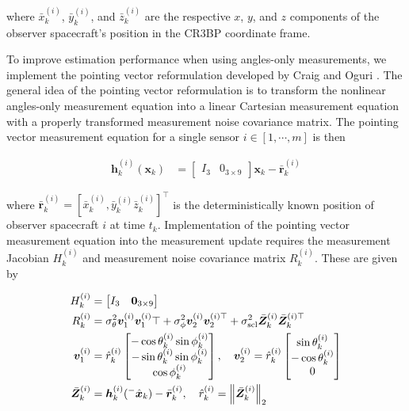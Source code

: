 \documentclass[letterpaper, preprint, paper,11pt]{AAS}	%
\begin{document}
\noindent where $\bar{x}_k^{(i)}$, $\bar{y}_k^{(i)}$, and $\bar{z}_k^{(i)}$ are the respective $x$, $y$, and $z$ components of the observer spacecraft's position in the CR3BP coordinate frame. 

To improve estimation performance when using angles-only measurements, we implement the pointing vector reformulation developed by Craig and Oguri \cite{craig2024robust}. The general idea of the pointing vector reformulation is to transform the nonlinear angles-only measurement equation into a linear Cartesian measurement equation with a properly transformed measurement noise covariance matrix. The pointing vector measurement equation for a single sensor $i \in [1, \cdots, m]$ is then 

\begin{align}
    \bm{h}_k^{(i)}(\bm{x}_k) &= \begin{bmatrix}
        I_3 & 0_{3 \times 9}
    \end{bmatrix} \bm{x}_k - \bar{\bm{r}}_k^{(i)}
\end{align}

\noindent where $\bar{\bm{r}}_k^{(i)} = [\bar{x}_k^{(i)}, \bar{y}_k^{(i)}\bar{z}_k^{(i)}]^\top$ is the deterministically known position of observer spacecraft $i$ at time $t_k$. Implementation of the pointing vector measurement equation into the measurement update requires the measurement Jacobian $H_k^{(i)}$ and measurement noise covariance matrix $R_k^{(i)}$. These are given by

\begin{align}
    H_k^{(i)} &= \begin{bmatrix}
        I_3 & \bm{0}_{3 \times 9} 
    \end{bmatrix} \\
    R_k^{(i)} &= \sigma_\theta^2 \bm{v}_1^{(i)}\bm{v}_1^{(i)}\top + \sigma_\phi^2\bm{v}_2^{(i)}\bm{v}_2^{(i)\top} + \sigma_\text{scl}^2 \bar{\bm{Z}}_k^{(i)} \bar{\bm{Z}}_k^{(i)\top} \\
    \bm{v}_1^{(i)} &= \hat{r}_k^{(i)}\begin{bmatrix}
        -\cos \theta_k^{(i)} \sin \phi_k^{(i)} \\
        -\sin \theta_k^{(i)} \sin \phi_k^{(i)} \\
        \cos \phi_k^{(i)}
    \end{bmatrix}, \quad \bm{v}_2^{(i)} = \hat{r}_k^{(i)} \begin{bmatrix}
        \sin \theta_k^{(i)} \\
        -\cos \theta_k^{(i)} \\
        0
    \end{bmatrix} \notag \\
    \bar{\bm{Z}}_k^{(i)} &= \bm{h}_k^{(i)}({}^-\hat{\bm{x}}_k) - \bar{\bm{r}}_k^{(i)}, \quad \hat{r}_k^{(i)} = \norm{\bar{\bm{Z}}_k^{(i)}}_2 \notag
\end{align}
\end{document}
